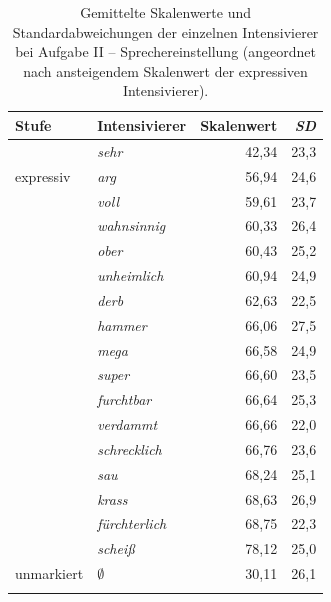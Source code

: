 \begin{table}
\begin{tabularx}{.8\textwidth}{Xlrr}
\lsptoprule
Stufe & Intensivierer  & Skalenwert                       & \textit{SD}\\
\midrule
 \rowcolor[gray]{.90}
\multicolumn{1}{l}{deskriptiv} & \textit{sehr} &  42,34 &  23,3\\
 \multicolumn{1}{l}{expressiv} & \textit{arg}  &  56,94 &  24,6\\
  \rowcolor[gray]{.90}
 & \textit{voll}         & 59,61 &   23,7\\
 & \textit{wahnsinnig}   & 60,33 &   26,4\\
    \rowcolor[gray]{.90}
  & \textit{ober}        & 60,43 &   25,2\\
 & \textit{unheimlich}   & 60,94 &   24,9\\
  \rowcolor[gray]{.90}
 & \textit{derb}         & 62,63 &   22,5\\
   & \textit{hammer}     & 66,06 &   27,5\\
  \rowcolor[gray]{.90}
 & \textit{mega}         & 66,58 &   24,9\\
  & \textit{super}       & 66,60 &   23,5\\
  \rowcolor[gray]{.90}
  & \textit{furchtbar}   & 66,64 &   25,3\\
  & \textit{verdammt}    & 66,66 &   22,0\\
  \rowcolor[gray]{.90}
  & \textit{schrecklich} & 66,76 &   23,6\\
 & \textit{sau}          & 68,24 &   25,1\\
  \rowcolor[gray]{.90}
   & \textit{krass}      & 68,63 &   26,9\\
  & \textit{fürchterlich} & 68,75 &  22,3\\
  \rowcolor[gray]{.90}
 & \textit{scheiß}       & 78,12 &   25,0\\
\multicolumn{1}{l}{unmarkiert} & \textit{$\emptyset$} & 30,11 &  26,1\\
\lspbottomrule
\end{tabularx}
\caption[Gemittelte Skalenwerte der einzelnen Intensivierer bei Aufgabe II von Experiment 1]{Gemittelte Skalenwerte und Standardabweichungen der einzelnen Intensivierer bei Aufgabe II -- Sprechereinstellung (angeordnet nach ansteigendem Skalenwert der expressiven Intensivierer).}
\label{SkaWey}
\end{table}



